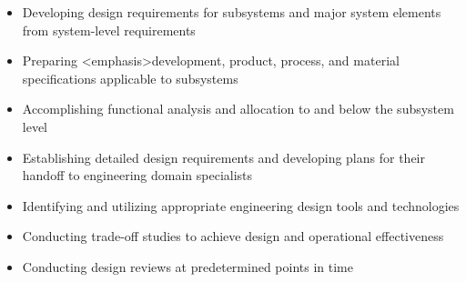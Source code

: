 \begin{itemize}
	\item Developing design requirements for subsystems and major system elements from system-level requirements
	\item Preparing <emphasis>development, product, process, and material specifications applicable to subsystems
	\item Accomplishing functional analysis and allocation to and below the subsystem level
	\item Establishing detailed design requirements and developing plans for their handoff to engineering domain specialists
	\item Identifying and utilizing appropriate engineering design tools and technologies
	\item Conducting trade-off studies to achieve design and operational effectiveness
	\item Conducting design reviews at predetermined points in time
\end{itemize}

